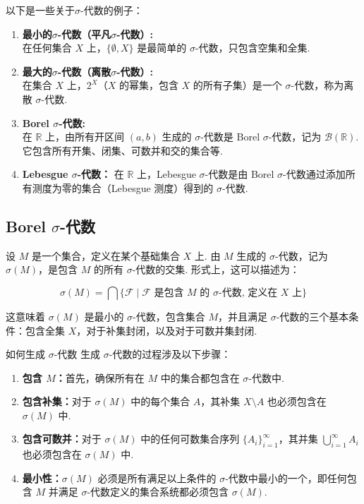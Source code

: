 \documentclass[UTF8,12pt,AutoFakeBold]{ctexart}
\numberwithin{equation}{section}%
\begin{document}
	
	\begin{example}	以下是一些关于$\sigma$-代数的例子：\\

		\begin{enumerate}
			\item \textbf{最小的$\sigma$-代数（平凡$\sigma$-代数）:}\\
			在任何集合 $X$ 上，$\{\emptyset, X\}$ 是最简单的 $\sigma$-代数，只包含空集和全集.
			\item \textbf{最大的$\sigma$-代数（离散$\sigma$-代数）:}\\
			在集合 $X$ 上，$2^X$（$X$ 的幂集，包含 $X$ 的所有子集）是一个 $\sigma$-代数，称为离散 $\sigma$-代数.
			\item \textbf{Borel $\sigma$-代数:}\\
			在 $\mathbb{R}$ 上，由所有开区间 $(a, b)$ 生成的 $\sigma$-代数是 Borel $\sigma$-代数，记为 $\mathcal{B}(\mathbb{R})$. 它包含所有开集、闭集、可数并和交的集合等.
			\item \textbf{ Lebesgue $\sigma$-代数：}
			在 $\mathbb{R}$ 上，Lebesgue $\sigma$-代数是由 Borel $\sigma$-代数通过添加所有测度为零的集合（Lebesgue 测度）得到的 $\sigma$-代数.
		\end{enumerate}
	\end{example}

	\subsection{Borel $\sigma$-代数}
	\begin{definition}
		设 $M$ 是一个集合，定义在某个基础集合 $X$ 上. 由 $M$ 生成的 $\sigma$-代数，记为 $\sigma(M)$，是包含 $M$ 的所有 $\sigma$-代数的交集. 形式上，这可以描述为：
		
		\[
		\sigma(M) = \bigcap \{\mathcal{F} \mid \mathcal{F} \text{ 是包含 } M \text{ 的 }\sigma\text{-代数, 定义在 } X \text{ 上}\}
		\]
		
		这意味着 $\sigma(M)$ 是最小的 $\sigma$-代数，包含集合 $M$，并且满足 $\sigma$-代数的三个基本条件：包含全集 $X$，对于补集封闭，以及对于可数并集封闭.
	\end{definition}
	
	
	\begin{ascolorbox1}[过程]{如何生成 $\sigma$-代数}
		生成 $\sigma$-代数的过程涉及以下步骤：
		\begin{enumerate}
			\item  \textbf{包含 $M$：}首先，确保所有在 $M$ 中的集合都包含在 $\sigma$-代数中.
			\item \textbf{ 包含补集：}对于 $\sigma(M)$ 中的每个集合 $A$，其补集 $X \setminus A$ 也必须包含在 $\sigma(M)$ 中.
			\item \textbf{ 包含可数并：}对于 $\sigma(M)$ 中的任何可数集合序列 $\{A_i\}_{i=1}^\infty$，其并集 $\bigcup_{i=1}^\infty A_i$ 也必须包含在 $\sigma(M)$ 中.
			\item \textbf{ 最小性：}$\sigma(M)$ 必须是所有满足以上条件的 $\sigma$-代数中最小的一个，即任何包含 $M$ 并满足 $\sigma$-代数定义的集合系统都必须包含 $\sigma(M)$.
		\end{enumerate}
	\end{ascolorbox1}
	
\end{document}
